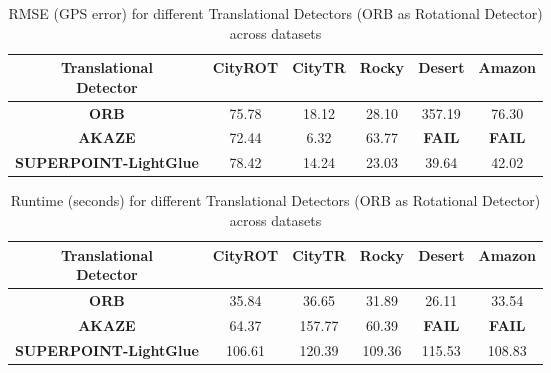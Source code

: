 \begin{table}[H]
    \centering
    \begin{tabular}{|c|c|c|c|c|c|}
        \hline
        \makecell{\textbf{Translational} \\ \textbf{Detector}} & \textbf{CityROT} & \textbf{CityTR} & \textbf{Rocky} & \textbf{Desert} & \textbf{Amazon} \\ 
        \hline
        \textbf{ORB} & 75.78 & 18.12 & 28.10 & 357.19 & 76.30 \\ 
        \hline
        \textbf{AKAZE} & 72.44 & 6.32 & 63.77 & \textbf{FAIL} & \textbf{FAIL} \\ 
        \hline
        \textbf{SUPERPOINT-LightGlue} & 78.42 & 14.24 & 23.03 & 39.64 & 42.02 \\ 
        \hline
    \end{tabular}
    \caption{RMSE (GPS error) for different Translational Detectors (ORB as Rotational Detector) across datasets}
\end{table}


\begin{table}[H]
    \centering
    \begin{tabular}{|c|c|c|c|c|c|}
        \hline
        \makecell{\textbf{Translational} \\ \textbf{Detector}} & \textbf{CityROT} & \textbf{CityTR} & \textbf{Rocky} & \textbf{Desert} & \textbf{Amazon} \\ 
        \hline
        \textbf{ORB} & 35.84 & 36.65 & 31.89 & 26.11 & 33.54 \\ 
        \hline
        \textbf{AKAZE} & 64.37 & 157.77 & 60.39 & \textbf{FAIL} & \textbf{FAIL} \\ 
        \hline
        \textbf{SUPERPOINT-LightGlue} & 106.61 & 120.39 & 109.36 & 115.53 & 108.83 \\ 
        \hline
    \end{tabular}
    \caption{Runtime (seconds) for different Translational Detectors (ORB as Rotational Detector) across datasets}
\end{table}
